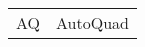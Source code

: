 \begin{table}[H]
\hspace{-9pt}	%
\begin{tabular}{p{} p{}} %
 AQ		&	AutoQuad \\
\end{tabular}
\end{table}